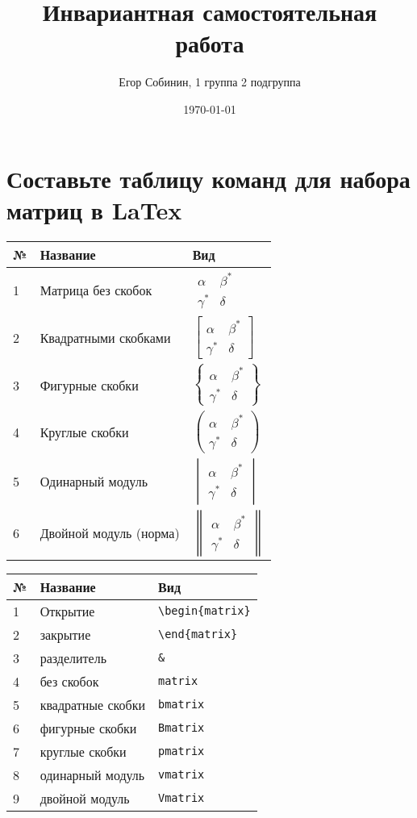 \documentclass[a4paper,12pt]{article} %
\author{Егор Собинин, 1 группа 2 подгруппа}
\title{Инвариантная самостоятельная работа}
\date{\today}
\begin{document}
\maketitle
\newpage
\section{Составьте таблицу команд для набора матриц в LaTex}
\hspace{6mm}\begin{tabular}{|l||l||l|}
\hline
 № & Название & Вид\\
 \hline\hline
 1 & Матрица без скобок & $\begin{matrix} \alpha& \beta^{*}\\ \gamma^{*}& \delta \end{matrix}$\\
 \hline
 2 & Квадратными скобками & $\begin{bmatrix} \alpha& \beta^{*}\\ \gamma^{*}& \delta \end{bmatrix}$\\
 \hline
 3 & Фигурные скобки & $\begin{Bmatrix} \alpha& \beta^{*}\\ \gamma^{*}& \delta \end{Bmatrix}$\\
 \hline
 4 & Круглые скобки & $\begin{pmatrix} \alpha& \beta^{*}\\ \gamma^{*}& \delta \end{pmatrix}$\\
 \hline
 5 & Одинарный модуль & $\begin{vmatrix} \alpha& \beta^{*}\\ \gamma^{*}& \delta \end{vmatrix}$\\
 \hline
 6 & Двойной модуль (норма) & $\begin{Vmatrix} \alpha& \beta^{*}\\ \gamma^{*}& \delta \end{Vmatrix}$\\
 \hline
 \end{tabular}
 
\begin{tabular}{|l||l||l|}
\hline
№ & Название & Вид\\
 \hline\hline
 1 & Открытие & \verb|\begin{matrix}|\\
 2 & закрытие & \verb|\end{matrix}|\\
 3 & разделитель & \verb|&|\\
 4 & без скобок & \verb|matrix|\\
 5 & квадратные скобки & \verb|bmatrix|\\
 6 & фигурные скобки & \verb|Bmatrix|\\
 7 & круглые скобки & \verb|pmatrix|\\
 8 & одинарный модуль & \verb|vmatrix|\\
 9 & двойной модуль & \verb|Vmatrix|\\
 \hline
\end{tabular}
\end{document}
